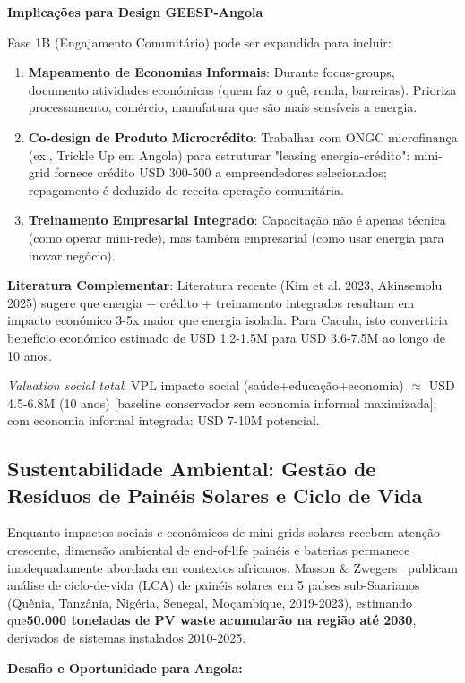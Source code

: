\documentclass[12pt, a4paper]{article}
\begin{document}
\textbf{Implicações para Design GEESP-Angola}

Fase 1B (Engajamento Comunitário) pode ser expandida para incluir:
\begin{enumerate}
\item \textbf{Mapeamento de Economias Informais}: Durante focus-groups, documento atividades económicas (quem faz o quê, renda, barreiras). Prioriza processamento, comércio, manufatura que são mais sensíveis a energia.
\item \textbf{Co-design de Produto Microcrédito}: Trabalhar com ONGC microfinança (ex., Trickle Up em Angola) para estruturar "leasing energia-crédito": mini-grid fornece crédito USD 300-500 a empreendedores selecionados; repagamento é deduzido de receita operação comunitária.
\item \textbf{Treinamento Empresarial Integrado}: Capacitação não é apenas técnica (como operar mini-rede), mas também empresarial (como usar energia para inovar negócio).
\end{enumerate}

\textbf{Literatura Complementar}: Literatura recente (Kim et al. 2023, Akinsemolu 2025) sugere que energia + crédito + treinamento integrados resultam em impacto económico 3-5x maior que energia isolada. Para Cacula, isto convertiria benefício económico estimado de USD 1.2-1.5M para USD 3.6-7.5M ao longo de 10 anos.

\textit{Valuation social total}: VPL impacto social (saúde+educação+economia) $\approx$ USD 4.5-6.8M (10 anos) [baseline conservador sem economia informal maximizada]; com economia informal integrada: USD 7-10M potencial.

\subsection{Sustentabilidade Ambiental: Gestão de Resíduos de Painéis Solares e Ciclo de Vida}

Enquanto impactos sociais e econômicos de mini-grids solares recebem atenção crescente, dimensão ambiental de end-of-life painéis e baterias permanece inadequadamente abordada em contextos africanos. Masson \& Zwegers~\citep{Masson2023} publicam análise de ciclo-de-vida (LCA) de painéis solares em 5 países sub-Saarianos (Quênia, Tanzânia, Nigéria, Senegal, Moçambique, 2019-2023), estimando que\textbf{50.000 toneladas de PV waste acumularão na região até 2030}, derivados de sistemas instalados 2010-2025. 

\textbf{Desafio e Oportunidade para Angola:}
\end{document}
